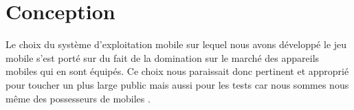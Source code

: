 \newpage
\section{Conception}
Le choix du système d'exploitation mobile sur lequel nous avons développé le jeu mobile s'est porté sur \android{} du fait de la domination sur le marché des appareils mobiles qui en sont équipés. Ce choix nous paraissait donc pertinent et approprié pour toucher un plus large public mais aussi pour les tests car nous sommes nous même des possesseurs de mobiles \android{}. 


